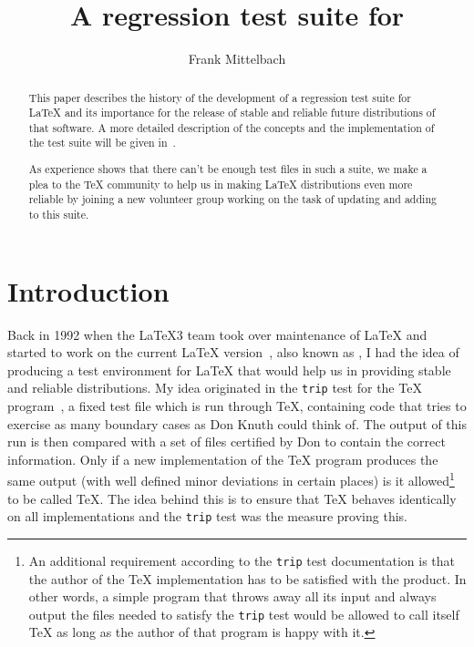\documentclass{ltugboat}
\begin{document}
\title{A regression test suite for \LaTeXe}

\author{Frank Mittelbach}
\address{\LaTeX3 project}


\maketitle

\begin{abstract}
  This paper describes the history of the development of a regression
  test suite for \LaTeX{} and its importance for the release of stable
  and reliable future distributions of that software.
  A more detailed description of the concepts and the
  implementation of the test suite will be given in~\cite{tub:xxx}.

  As experience shows that there can't be enough test files in such a
  suite, we make a plea to the \TeX{} community to help us in making
  \LaTeX{} distributions even more reliable by joining a new volunteer
  group working on the task of updating and adding to this suite.
\end{abstract}


\section{Introduction}

Back in 1992 when the \LaTeX3 team took over maintenance of \LaTeX{}
and started to work on the current \LaTeX{} version~\cite{A-W:LLa94},
also known as \LaTeXe{}, I had the idea of producing a test
environment for \LaTeX{} that would help us in providing stable and
reliable distributions. My idea originated in the
\texttt{trip} test for the \TeX{} program~\cite{Knuth:1984:TTT}, a
fixed test file which is run through \TeX{}, containing code that tries
to exercise as many boundary cases as Don Knuth could think of.  The
output of this run is then compared with a set of files certified by
Don to contain the correct information. Only if a new implementation
of the \TeX{} program produces the same output (with well defined minor
deviations in certain places) is it allowed\footnote{An additional
requirement according to the \texttt{trip} test documentation is that
the author of the \TeX{} implementation has to be satisfied with the
product. In other words, a simple program that throws away all its
input and always output the files needed to satisfy the \texttt{trip}
test would be allowed to call itself \TeX{} as long as the author of
that program is happy with it.} to be called \TeX{}.  The idea behind
this is to ensure that \TeX{} behaves identically on all
implementations and the \texttt{trip} test was the measure proving
this.
\end{document}
